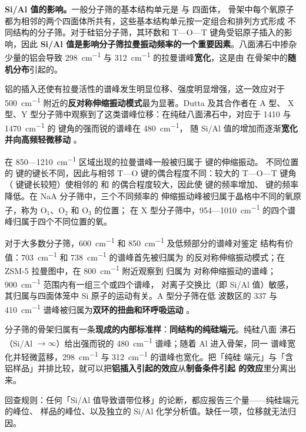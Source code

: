 \textbf{Si/Al 值的影响。}一般分子筛的基本结构单元是  与  四面体，
骨架中每个氧原子都为相邻的两个四面体所共有，这些基本结构单元按一定组合和排列方式形成
不同结构的分子筛。对于硅铝分子筛，其环数和 T—O—T 键角受铝原子插入的影响，因此
\textbf{Si/Al 值是影响分子筛拉曼振动频率的一个重要因素}。八面沸石中掺杂少量的铝会导致
\qty{298}{cm^{-1}} 与 \qty{312}{cm^{-1}} 的拉曼谱峰\textbf{宽化}，这是由 
在骨架中的\textbf{随机分布}引起的。

铝的插入还使有拉曼活性的谱峰发生明显位移、强度明显增强，这一效应对于
\qty{500}{cm^{-1}} 附近的\textbf{反对称伸缩振动模式}最为显著。Dutta 及其合作者在 A 型、
X 型、Y 型分子筛中观察到了这类谱峰位移：在纯硅八面沸石中，对应于 1410 与
\qty{1470}{cm^{-1}} 的  键角的强而锐的谱峰在 \qty{480}{cm^{-1}}，
随 Si/Al 值的增加而逐渐\textbf{宽化并向高频轻微移动}
。

在 850—\qty{1210}{cm^{-1}} 区域出现的拉曼谱峰一般被归属于  键的伸缩振动。
不同位置的  键的键长不同，因此与相邻 T—O 键的偶合程度不同：较大的 T—O—T
键角（ 键键长较短）使相邻的  和  的偶合程度较大，因此使
 键的频率增加、 键的频率降低。在 NaA 分子筛中，三个不同频率的
 伸缩振动峰被归属于晶格中不同的氧原子，称为 O$_1$、O$_2$ 和 O$_3$ 的位置；
在 X 型分子筛中，954—\qty{1010}{cm^{-1}} 的四个谱峰归属于四个不同位置的氧。

对于大多数分子筛，\qty{600}{cm^{-1}} 和 \qty{850}{cm^{-1}} 及低频部分的谱峰对鉴定
结构有价值：\qty{703}{cm^{-1}} 和 \qty{738}{cm^{-1}} 的谱峰首先被归属为
 的反对称伸缩振动模式；在 ZSM-5 拉曼图中，在 \qty{800}{cm^{-1}} 附近观察到
归属为  对称伸缩振动的谱峰；\qty{900}{cm^{-1}} 范围内有一组三个或四个谱峰，
对离子交换比（即 Si/Al 值）敏感，其归属与四面体笼中 Si 原子的运动有关。A 型分子筛在低
波数区的 337 与 \qty{410}{cm^{-1}} 谱峰被归属为\textbf{双环的扭曲和环呼吸运动}
。

\begin{crosscheck}
分子筛的骨架归属有一条\textbf{现成的内部标准样}：\textbf{同结构的纯硅端元}。纯硅八面
沸石（Si/Al $\to \infty$）给出强而锐的 \qty{480}{cm^{-1}} 谱峰；随着 Al 进入骨架，同一
谱峰宽化并轻微蓝移，\qty{298}{cm^{-1}} 与 \qty{312}{cm^{-1}} 的谱峰也宽化。把「纯硅
端元」与「含铝样品」并排比较，就可以把\textbf{铝插入引起的效应}从\textbf{制备条件引起
的效应}里分离出来。

回查规则：任何「Si/Al 值导致谱带位移」的论断，都应报告三个量——纯硅端元的峰位、
样品的峰位、以及独立的 Si/Al 化学分析值。缺任一项，位移就无法归因。
\end{crosscheck}

